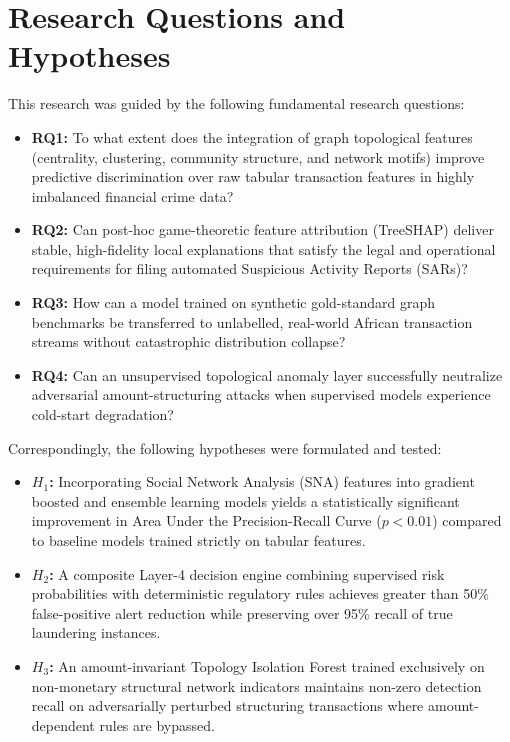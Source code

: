 \section{Research Questions and Hypotheses}
This research was guided by the following fundamental research questions:
\begin{itemize}
    \item \textbf{RQ1:} To what extent does the integration of graph topological features (centrality, clustering, community structure, and network motifs) improve predictive discrimination over raw tabular transaction features in highly imbalanced financial crime data?
    \item \textbf{RQ2:} Can post-hoc game-theoretic feature attribution (TreeSHAP) deliver stable, high-fidelity local explanations that satisfy the legal and operational requirements for filing automated Suspicious Activity Reports (SARs)?
    \item \textbf{RQ3:} How can a model trained on synthetic gold-standard graph benchmarks be transferred to unlabelled, real-world African transaction streams without catastrophic distribution collapse?
    \item \textbf{RQ4:} Can an unsupervised topological anomaly layer successfully neutralize adversarial amount-structuring attacks when supervised models experience cold-start degradation?
\end{itemize}

Correspondingly, the following hypotheses were formulated and tested:
\begin{itemize}
    \item \textbf{$H_1$:} Incorporating Social Network Analysis (SNA) features into gradient boosted and ensemble learning models yields a statistically significant improvement in Area Under the Precision-Recall Curve ($p < 0.01$) compared to baseline models trained strictly on tabular features.
    \item \textbf{$H_2$:} A composite Layer-4 decision engine combining supervised risk probabilities with deterministic regulatory rules achieves greater than 50\% false-positive alert reduction while preserving over 95\% recall of true laundering instances.
    \item \textbf{$H_3$:} An amount-invariant Topology Isolation Forest trained exclusively on non-monetary structural network indicators maintains non-zero detection recall on adversarially perturbed structuring transactions where amount-dependent rules are bypassed.
\end{itemize}

